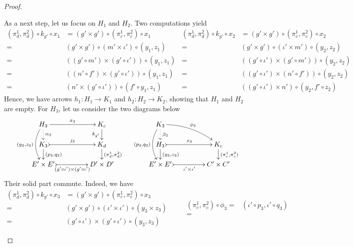 \documentclass[a4paper,UKenglish,cleveref,pdftex,amsthm,thm-restate,numberwithinsect]{cas-sc}
\theoremstyle{plain}
\theoremstyle{definition}
\begin{document}
\begin{proof}
\begin{enumerate}
As a next step, let us focus on $H_1$ and $H_2$. Two computations yield \small
 \[\begin{split}
(\pi^1_d, \pi^2_d)\circ k_{g'}\circ x_1&=(g'\times g')\circ (\pi^1_c, \pi^2_c)\circ x_1\\=&(g'\times g')\circ (m'\times \iota')\circ (y_1, z_1)\\=&((g'\circ m') \times (g'\circ \iota'))\circ (y_1, z_1)\\=&((n'\circ f') \times (g'\circ \iota'))\circ (y_1, z_1)\\=&(n'\times  (g'\circ \iota'))\circ (f'\circ y_1, z_1)
 \end{split} \hspace{1pt} \begin{split}
 (\pi^1_d, \pi^2_d)\circ k_{g'}\circ x_2&=(g'\times g')\circ (\pi^1_c, \pi^2_c)\circ x_2\\=&(g'\times g')\circ ( \iota' \times m')\circ (y_2, z_2)\\=&((g'\circ \iota') \times (g'\circ m'))\circ (y_2, z_2)\\=&( (g'\circ \iota') \times (n'\circ f'))\circ (y_2, z_2)\\=&((g'\circ \iota') \times n')\circ (y_2, f'\circ z_2)
 \end{split} \]
\normalsize
 Hence, we have arrows $h_1\colon H_1\to K_1$ and $h_2\colon H_2\to K_2$, showing that $H_1$ and $H_2$ are empty. For $H_3$, let us consider the two diagrams below
 \[ \xymatrix@C=45pt@R=15pt{ H_3 \ar@{.>}[d]^{\alpha_3} \ar[r]^{x_3} \ar@/_.4cm/[dd]_{(y_3, z_3)} & K_c \ar[d]_{k_{g'}}& K_3 \ar@{.>}[d]^{\beta_3} \ar@/^.3cm$ $/[dr]^{\phi_3} \ar@/_.4cm/[dd]_{(p_3, q_3)}\\K_3 \ar@{>->}[r]^{j_3}  \ar[d]^{(p_3, q_3)} & K_d \ar[d]^{(\pi^1_d, \pi^2_d)} &  H_3 \ar@{>->}[r]^{x_3}  \ar[d]^{(y_3, z_3)} & K_c \ar[d]^{(\pi^1_c, \pi^2_c)}  \\
   E'\times E' \ar@{>->}[r]_-{(g'\circ \iota')\times (g'\circ \iota')} & D'\times D' & E'\times E' \ar@{>->}[r]_-{ \iota'\times  \iota'} & C'\times C'}\]
 Their solid part commute. Indeed, we have
 \[\begin{split}
 	(\pi^1_d, \pi^2_d)\circ k_{g'}\circ x_3&=(g'\times g')\circ (\pi^1_c, \pi^2_c) \circ x_3\\=&(g'\times g')\circ (\iota'\times \iota')\circ (y_3\times z_3)\\=&(g'\circ \iota') \times (g'\circ \iota')\circ (y_3, z_3)
 \end{split}\qquad \begin{split}
 (\pi^1_c, \pi^2_c)\circ \phi_3=&(\iota'\circ p_3, \iota' \circ q_3)\\=&

\end{split}\]
\end{enumerate}
\end{proof}
\end{document}
